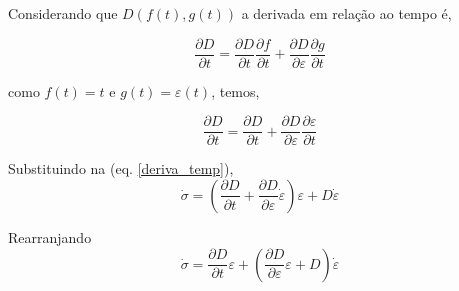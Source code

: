 \documentclass[12pt,a4paper]{article}
\begin{document}
Considerando que $D(f(t),g(t))$ a derivada em relação ao tempo é, 

\begin{equation}
\frac{\partial D}{\partial t} = \frac{\partial D}{\partial t} \frac{\partial f}{\partial t} + \frac{\partial D}{\partial \varepsilon} \frac{\partial g}{\partial t}
\end{equation}

\noindent 
como $f(t) = t$ e $g(t) = \varepsilon(t)$, temos,

\begin{equation}
\frac{\partial D}{\partial t} = \frac{\partial D}{\partial t} + \frac{\partial D}{\partial \varepsilon} \frac{\partial \varepsilon}{\partial t}
\end{equation}

\noindent 
Substituindo na (eq. \ref{deriva_temp}),
\begin{equation}
\dot \sigma = \left(\frac{\partial D}{\partial t} + \frac{\partial D}{\partial \varepsilon} \dot \varepsilon\right) \varepsilon + D \dot \varepsilon
\end{equation}

\noindent 
Rearranjando
\begin{equation}
\dot \sigma = \frac{\partial D}{\partial t} \varepsilon + \left( \frac{\partial D}{\partial \varepsilon} \varepsilon + D \right) \dot \varepsilon
\end{equation} 
 
 
\end{document}
